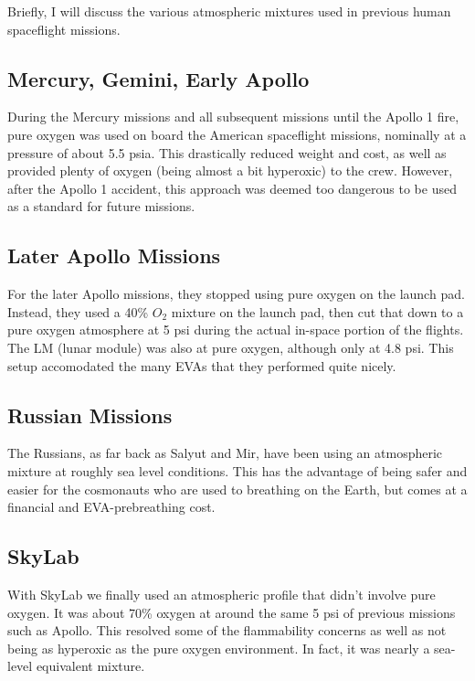 \documentclass{article}
\begin{document}
  Briefly, I will discuss the various atmospheric mixtures used in previous human spaceflight missions.

  \subsection{Mercury, Gemini, Early Apollo}

  During the Mercury missions and all subsequent missions until the Apollo 1 fire, pure oxygen was used on board the American spaceflight missions, nominally at a pressure of about 5.5 psia. This drastically reduced weight and cost, as well as provided plenty of oxygen (being almost a bit hyperoxic) to the crew. However, after the Apollo 1 accident, this approach was deemed too dangerous to be used as a standard for future missions.

  \subsection{Later Apollo Missions}

  For the later Apollo missions, they stopped using pure oxygen on the launch pad. Instead, they used a 40\% $O_2$ mixture on the launch pad, then cut that down to a pure oxygen atmosphere at 5 psi during the actual in-space portion of the flights. The LM (lunar module) was also at pure oxygen, although only at 4.8 psi. This setup accomodated the many EVAs that they performed quite nicely.

  \subsection{Russian Missions}

  The Russians, as far back as Salyut and Mir, have been using an atmospheric mixture at roughly sea level conditions. This has the advantage of being safer and easier for the cosmonauts who are used to breathing on the Earth, but comes at a financial and EVA-prebreathing cost.

  \subsection{SkyLab}

  With SkyLab we finally used an atmospheric profile that didn't involve pure oxygen. It was about 70\% oxygen at around the same 5 psi of previous missions such as Apollo. This resolved some of the flammability concerns as well as not being as hyperoxic as the pure oxygen environment. In fact, it was nearly a sea-level equivalent mixture.
\end{document}
